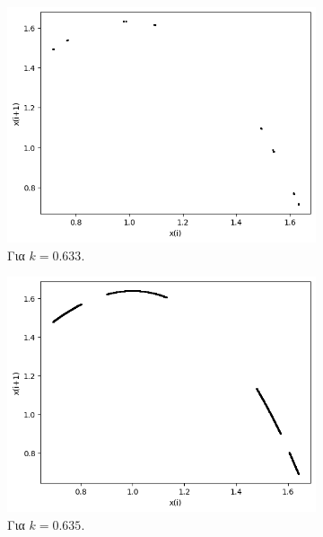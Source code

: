 \begin{figure}
	\centering
	\begin{subfigure}[b]{0.4\textwidth}
		\centering
		\includegraphics[width=\textwidth]{LateX images/graphs q09/g7}
		\caption{Για $k=0.633$.}
		\label{f:k53}
	\end{subfigure}
	\hfill
	\begin{subfigure}[b]{0.4\textwidth}
		\centering
		\includegraphics[width=\textwidth]{LateX images/graphs q09/g8}
		\caption{Για $k=0.635$.}
		\label{f:k54}
	\end{subfigure}
	\hfill
	\begin{subfigure}[b]{0.4\textwidth}
		\centering

\end{subfigure}
\end{figure}
